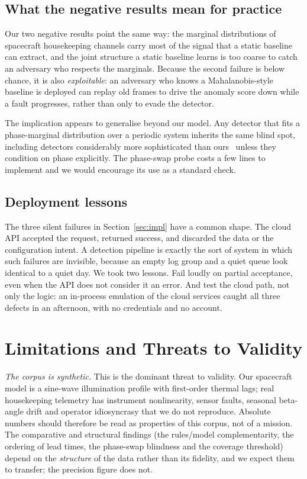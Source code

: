 \documentclass[conference]{IEEEtran}
\begin{document}
\subsection{What the negative results mean for practice}

Our two negative results point the same way: the marginal distributions of
spacecraft housekeeping channels carry most of the signal that a static baseline
can extract, and the joint structure a static baseline learns is too coarse to
catch an adversary who respects the marginals. Because the second failure is
below chance, it is also \emph{exploitable}: an adversary who knows a
Mahalanobis-style baseline is deployed can replay old frames to drive the
anomaly score down while a fault progresses, rather than only to evade the
detector.

The implication appears to generalise beyond our model. Any detector that fits a
phase-marginal distribution over a periodic system inherits the same blind spot,
including detectors considerably more sophisticated than
ours~\cite{hundman2018lstm,yairi2017datadriven} unless they condition on phase
explicitly. The phase-swap probe costs a few lines to implement and we would
encourage its use as a standard check.

\subsection{Deployment lessons}

The three silent failures in Section~\ref{sec:impl} have a common shape. The cloud API
accepted the request, returned success, and discarded the data or the
configuration intent. A detection pipeline is exactly the sort of system in
which such failures are invisible, because an empty log group and a quiet
queue look identical to a quiet day. We took two lessons. Fail loudly on partial
acceptance, even when the API does not consider it an error. And test the cloud
path, not only the logic: an in-process emulation of the cloud services caught
all three defects in an afternoon, with no credentials and no account.

\section{Limitations and Threats to Validity}
\label{sec:limitations}

\emph{The corpus is synthetic.} This is the dominant threat to validity. Our
spacecraft model is a sine-wave illumination profile with
first-order thermal lags; real housekeeping telemetry has instrument
nonlinearity, sensor faults, seasonal beta-angle drift and operator idiosyncrasy
that we do not reproduce. Absolute numbers should therefore be read as
properties of this corpus, not of a mission. The comparative and structural
findings (the rules/model complementarity, the ordering of lead times, the
phase-swap blindness and the coverage threshold) depend on the \emph{structure}
of the data rather than its fidelity, and we expect them to transfer; the
precision figure does not.
\end{document}
